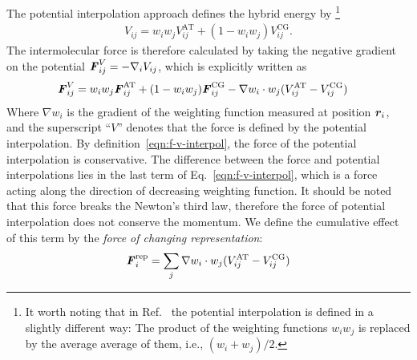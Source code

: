 \documentclass[epjST]{svjour}
\newcommand{\recheck}[1]{{\color{red} #1}}
\newcommand{\vect}[1]{\textbf{\textit{#1}}}
\newcommand{\AT}[0]{\textrm{AT}}
\newcommand{\CG}[0]{\textrm{CG}}
\newcommand{\moleidxone}[0]{i}
\newcommand{\moleidxtwo}[0]{j}
\newcommand{\rep}{{\textrm{rep}}}
\begin{document}
The potential interpolation approach defines the hybrid energy by
\footnote{
\recheck{
  It worth noting that in Ref.~\cite{potestio2013hamiltonian} the potential interpolation is defined in a slightly different way:
  The product of the weighting functions $w_\moleidxone w_\moleidxtwo$ is replaced by the average average of them, i.e., $(w_\moleidxone + w_\moleidxtwo)/2$.}}
\begin{align}\label{eqn:v-v-interpol}
  {V}_{\moleidxone \moleidxtwo}=w_\moleidxone w_\moleidxtwo{V}_{\moleidxone\moleidxtwo}^{\AT}+(1-w_\moleidxone w_\moleidxtwo){V}^{\CG}_{\moleidxone\moleidxtwo}.
\end{align}
The intermolecular force is therefore calculated by taking the negative gradient on the potential ${\vect F}^V_{\moleidxone \moleidxtwo}= -\nabla_{\moleidxone}{V}_{\moleidxone \moleidxtwo}$,
which is explicitly written as
\begin{align}\label{eqn:f-v-interpol}
  {\vect F}^V_{\moleidxone \moleidxtwo}
  &=w_\moleidxone w_\moleidxtwo{\vect F}_{\moleidxone\moleidxtwo}^{\AT}+(1-w_\moleidxone w_\moleidxtwo){\vect F}^{\CG}_{\moleidxone\moleidxtwo}  - \nabla w_\moleidxone\cdot w_\moleidxtwo (V^\AT_{\moleidxone \moleidxtwo} - V^\CG_{\moleidxone \moleidxtwo})
\end{align}
Where $\nabla w_\moleidxone$ is the gradient of the weighting function measured at position $\vect r_\moleidxone$,
and the superscript ``$V$'' denotes that the force is defined
by the potential interpolation.
By  definition~\eqref{eqn:f-v-interpol}, the force of the potential interpolation is conservative. 
The difference between the force and potential
interpolations lies in the last term  of Eq.~\eqref{eqn:f-v-interpol}, which is a force
acting along the direction of decreasing weighting function.
It should be noted that
this force breaks the Newton's third law, therefore the force of potential interpolation
does not conserve the momentum.
We define the cumulative effect of this term by the \emph{force of changing representation}:
\begin{align}
  \vect F_\moleidxone^\rep = \sum_{\moleidxtwo}  \nabla w_\moleidxone\cdot w_\moleidxtwo (V^\AT_{\moleidxone \moleidxtwo} - V^\CG_{\moleidxone \moleidxtwo})
\end{align}
\end{document}
